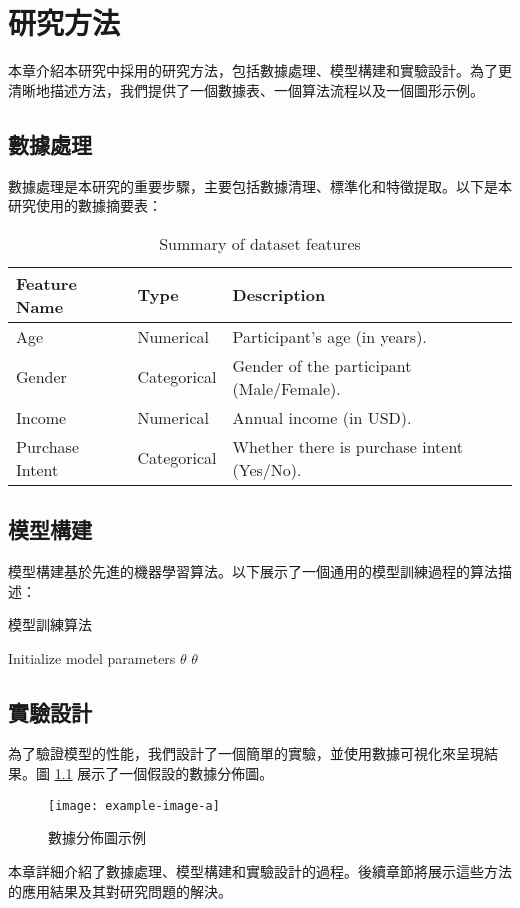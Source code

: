 \chapter{研究方法}
\label{c:methods}
本章介紹本研究中採用的研究方法，包括數據處理、模型構建和實驗設計。為了更清晰地描述方法，我們提供了一個數據表、一個算法流程以及一個圖形示例。

\section{數據處理}

數據處理是本研究的重要步驟，主要包括數據清理、標準化和特徵提取。以下是本研究使用的數據摘要表：

\begin{table}[htbp]
\centering
\begin{tabularx}{\textwidth}{@{}lXX@{}}
\toprule
\textbf{Feature Name} & \textbf{Type} & \textbf{Description} \\ 
\midrule
Age                   & Numerical      & Participant's age (in years). \\ 
Gender                & Categorical    & Gender of the participant (Male/Female). \\ 
Income                & Numerical      & Annual income (in USD). \\ 
Purchase Intent       & Categorical    & Whether there is purchase intent (Yes/No). \\ 
\bottomrule
\end{tabularx}
\caption{Summary of dataset features}
\label{tab:data_summary}
\end{table}

\section{模型構建}

模型構建基於先進的機器學習算法。以下展示了一個通用的模型訓練過程的算法描述：

\begin{algorithm}[htbp]
\caption{模型訓練算法}
\label{alg:model_training}

Initialize model parameters \( \theta \)\;
\Return \( \theta \;
\)
\end{algorithm}

\section{實驗設計}

為了驗證模型的性能，我們設計了一個簡單的實驗，並使用數據可視化來呈現結果。圖 \ref{fig:example_figure} 展示了一個假設的數據分佈圖。

\begin{figure}[htbp]
\centering
\texttt{[image: example-image-a]}
\caption{數據分佈圖示例}
\label{fig:example_figure}
\end{figure}

本章詳細介紹了數據處理、模型構建和實驗設計的過程。後續章節將展示這些方法的應用結果及其對研究問題的解決。
